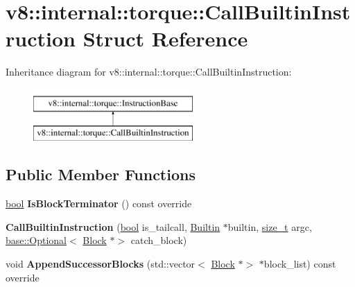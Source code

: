 \hypertarget{structv8_1_1internal_1_1torque_1_1CallBuiltinInstruction}{}\section{v8\+:\+:internal\+:\+:torque\+:\+:Call\+Builtin\+Instruction Struct Reference}
\label{structv8_1_1internal_1_1torque_1_1CallBuiltinInstruction}
Inheritance diagram for v8\+:\+:internal\+:\+:torque\+:\+:Call\+Builtin\+Instruction\+:\begin{figure}[H]
\begin{center}
\leavevmode
\includegraphics[height=2.000000cm]{structv8_1_1internal_1_1torque_1_1CallBuiltinInstruction}
\end{center}
\end{figure}
\subsection*{Public Member Functions}
\begin{DoxyCompactItemize}
\item 
\mbox{\label{structv8_1_1internal_1_1torque_1_1CallBuiltinInstruction_a47f74d52a98e5181bb2afc02bc3f5bba}} 
\mbox{\hyperlink{classbool}{bool}} {\bfseries Is\+Block\+Terminator} () const override
\item 
\mbox{\label{structv8_1_1internal_1_1torque_1_1CallBuiltinInstruction_a430d0373905e4a0b354f598898af4752}} 
{\bfseries Call\+Builtin\+Instruction} (\mbox{\hyperlink{classbool}{bool}} is\+\_\+tailcall, \mbox{\hyperlink{classv8_1_1internal_1_1torque_1_1Builtin}{Builtin}} $\ast$builtin, \mbox{\hyperlink{classsize__t}{size\+\_\+t}} argc, \mbox{\hyperlink{classv8_1_1base_1_1Optional}{base\+::\+Optional}}$<$ \mbox{\hyperlink{classv8_1_1internal_1_1torque_1_1Block}{Block}} $\ast$$>$ catch\+\_\+block)
\item 
\mbox{\label{structv8_1_1internal_1_1torque_1_1CallBuiltinInstruction_a50574e5edad783d7749a7f246edc400a}} 
void {\bfseries Append\+Successor\+Blocks} (std\+::vector$<$ \mbox{\hyperlink{classv8_1_1internal_1_1torque_1_1Block}{Block}} $\ast$$>$ $\ast$block\+\_\+list) const override
\end{DoxyCompactItemize}
